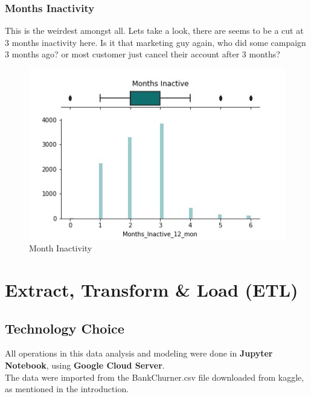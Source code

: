 \documentclass{homeworg}
\begin{document}
\subsubsection{Months Inactivity}
This is the weirdest amongst all. Lets take a look, there are seems to be a cut at 3 months inactivity here. Is it that marketing guy again, who did some campaign 3 months ago? or most customer just cancel their account after 3 months?
\begin{figure}[H]
    \centering
    \includegraphics[scale=0.7]{figure/HG_Month_inactive.jpg}
    \caption{Month Inactivity}
    \label{fig:inactivity}
\end{figure}



\section{Extract, Transform \& Load (ETL)}
\subsection{Technology Choice}
All operations in this data analysis and modeling were done in \textbf{Jupyter Notebook}, using \textbf{Google Cloud Server}.\\
The data were imported from the BankChurner.csv file downloaded from kaggle, as mentioned in the introduction.\par
\end{document}
